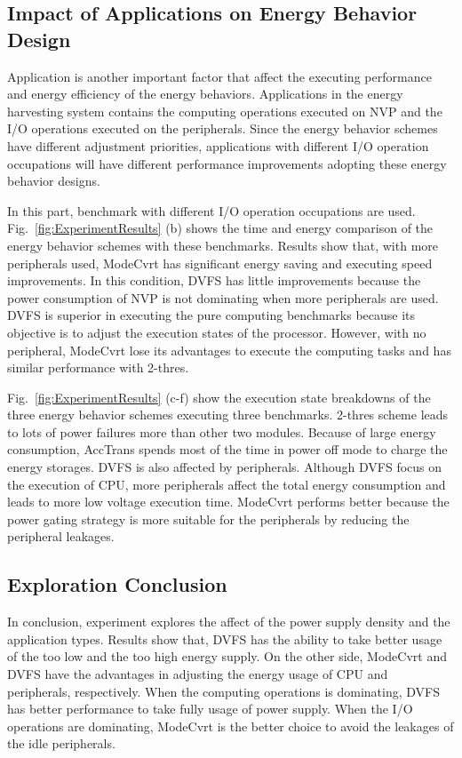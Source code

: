 \subsection{Impact of Applications on Energy Behavior Design}	\label{sec:exp-app}
%
Application is another important factor that affect the executing performance and energy efficiency of the energy behaviors.
Applications in the energy harvesting system contains the computing operations executed on NVP and the I/O operations executed on the peripherals.
Since the energy behavior schemes have different adjustment priorities, applications with different I/O operation occupations will have different performance improvements adopting these energy behavior designs.

In this part, benchmark with different I/O operation occupations are used.
Fig.~\ref{fig:ExperimentResults} (b) shows the time and energy comparison of the energy behavior schemes with these benchmarks.
Results show that, with more peripherals used, ModeCvrt has significant energy saving and executing speed improvements.
In this condition, DVFS has little improvements because the power consumption of NVP is not dominating when more peripherals are used.
DVFS is superior in executing the pure computing benchmarks because its objective is to adjust the execution states of the processor.
However, with no peripheral, ModeCvrt lose its advantages to execute the computing tasks and has similar performance with 2-thres.

Fig.~\ref{fig:ExperimentResults} (c-f) show the execution state breakdowns of the three energy behavior schemes executing three benchmarks.
2-thres scheme leads to lots of power failures more than other two modules.
Because of large energy consumption, AccTrans spends most of the time in power off mode to charge the energy storages.
DVFS is also affected by peripherals.
Although DVFS focus on the execution of CPU, more peripherals affect the total energy consumption and leads to more low voltage execution time.
ModeCvrt performs better because the power gating strategy is more suitable for the peripherals by reducing the peripheral leakages.

\subsection{Exploration Conclusion}	\label{sec:exp-sum}
%
In conclusion, experiment explores the affect of the power supply density and the application types. 
Results show that, DVFS has the ability to take better usage of the too low and the too high energy supply.
On the other side, ModeCvrt and DVFS have the advantages in adjusting the energy usage of CPU and peripherals, respectively.
When the computing operations is dominating, DVFS has better performance to take fully usage of power supply.
When the I/O operations are dominating, ModeCvrt is the better choice to avoid the leakages of the idle peripherals.
